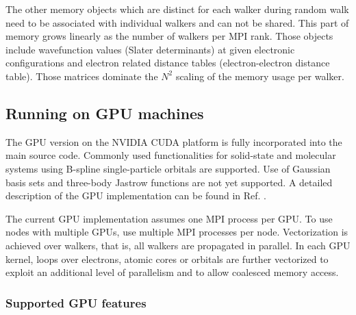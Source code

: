 The other memory objects which are distinct for each walker during random walk need to be associated with individual walkers and can not be shared. This part of memory grows linearly as the number of walkers per MPI rank. Those objects include wavefunction values (Slater determinants) at given electronic configurations and electron related distance tables (electron-electron distance table). Those matrices dominate the $N^2$ scaling of the memory usage per walker.

\subsection{Running on GPU machines}
\label{sec:gpurunning}

The GPU version on the NVIDIA CUDA platform is fully incorporated into
the main source code. Commonly used functionalities for
solid-state and molecular systems using B-spline single-particle
orbitals are supported. Use of Gaussian basis sets and three-body
Jastrow functions are not yet supported. A detailed description of the GPU
implementation can be found in Ref. \cite{EslerKimCeperleyShulenburger2012}.

The current GPU implementation assumes one MPI process per GPU. To use
nodes with multiple GPUs, use multiple MPI processes per node.
Vectorization is achieved over walkers, that is, all walkers are
propagated in parallel. In each GPU kernel, loops over electrons,
atomic cores or orbitals are further vectorized to exploit an
additional level of parallelism and to allow coalesced memory access.


\subsubsection{Supported GPU features}

